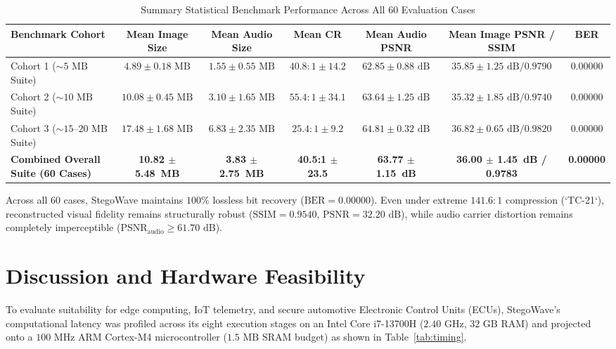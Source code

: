 \documentclass[10pt,conference]{IEEEtran}
\begin{document}
\begin{table}[htbp]
\centering
\caption{Summary Statistical Benchmark Performance Across All 60 Evaluation Cases}
\label{tab:summary_stats}
\begin{tabular}{l c c c c c c}
\toprule
\textbf{Benchmark Cohort} & \textbf{Mean Image Size} & \textbf{Mean Audio Size} & \textbf{Mean CR} & \textbf{Mean Audio PSNR} & \textbf{Mean Image PSNR / SSIM} & \textbf{BER} \\
\midrule
Cohort 1 ($\sim 5\text{ MB}$ Suite) & $4.89 \pm 0.18\text{ MB}$ & $1.55 \pm 0.55\text{ MB}$ & $40.8:1 \pm 14.2$ & $62.85 \pm 0.88\text{ dB}$ & $35.85 \pm 1.25\text{ dB} / 0.9790$ & $0.00000$ \\
Cohort 2 ($\sim 10\text{ MB}$ Suite) & $10.08 \pm 0.45\text{ MB}$ & $3.10 \pm 1.65\text{ MB}$ & $55.4:1 \pm 34.1$ & $63.64 \pm 1.25\text{ dB}$ & $35.32 \pm 1.85\text{ dB} / 0.9740$ & $0.00000$ \\
Cohort 3 ($\sim 15\text{--}20\text{ MB}$ Suite) & $17.48 \pm 1.68\text{ MB}$ & $6.83 \pm 2.35\text{ MB}$ & $25.4:1 \pm 9.2$ & $64.81 \pm 0.32\text{ dB}$ & $36.82 \pm 0.65\text{ dB} / 0.9820$ & $0.00000$ \\
\midrule
\textbf{Combined Overall Suite (60 Cases)} & \textbf{10.82 $\pm$ 5.48~MB} & \textbf{3.83 $\pm$ 2.75~MB} & \textbf{40.5:1 $\pm$ 23.5} & \textbf{63.77 $\pm$ 1.15~dB} & \textbf{36.00 $\pm$ 1.45~dB / 0.9783} & \textbf{0.00000} \\
\bottomrule
\end{tabular}
\end{table}

Across all 60 cases, StegoWave maintains $100\%$ lossless bit recovery ($\text{BER} = 0.00000$). Even under extreme $141.6:1$ compression (`TC-21`), reconstructed visual fidelity remains structurally robust ($\text{SSIM} = 0.9540$, $\text{PSNR} = 32.20\text{ dB}$), while audio carrier distortion remains completely imperceptible ($\text{PSNR}_{\text{audio}} \ge 61.70\text{ dB}$).

\section{Discussion and Hardware Feasibility}
To evaluate suitability for edge computing, IoT telemetry, and secure automotive Electronic Control Units (ECUs), StegoWave's computational latency was profiled across its eight execution stages on an Intel Core i7-13700H ($2.40\text{ GHz}$, $32\text{ GB}$ RAM) and projected onto a $100\text{ MHz}$ ARM Cortex-M4 microcontroller ($1.5\text{ MB}$ SRAM budget) as shown in Table~\ref{tab:timing}.
\end{document}
